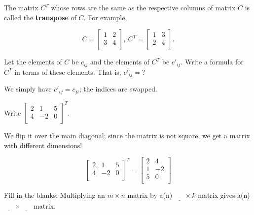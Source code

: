 \documentclass[../gatm_answers.tex]{subfiles}
\begin{document}
\begin{outer_problem}
\item The matrix $C^T$ whose rows are the same as the respective columns of matrix $C$ is called the \textbf{transpose} of $C$. For example,

$$C=\left[\begin{array}{cc}
1 & 2 \\
3 & 4 \\
\end{array}\right],\: C^T=\left[\begin{array}{cc}
1 & 3 \\
2 & 4 \\
\end{array}\right].$$
\end{outer_problem}

\begin{inner_problem}[start=1]
\item Let the elements of $C$ be $c_{ij}$ and the elements of $C^T$ be $c'_{ij}$. Write a formula for $C^T$ in terms of these elements. That is, $c'_{ij} = $?
\end{inner_problem}

We simply have $c'_{ij} = c_{ji}$; the indices are swapped.

\begin{inner_problem}
\item Write $\left[\begin{array}{ccc}
2 & 1 & 5 \\
4 & -2 & 0 \\
\end{array}\right]^T$.
\end{inner_problem}

We flip it over the main diagonal; since the matrix is not square, we get a matrix with different dimensions!

$$\left[\begin{array}{ccc}
2 & 1 & 5 \\
4 & -2 & 0 \\
\end{array}\right]^T = \begin{bmatrix}
2 & 4 \\
1 & -2 \\
5 & 0 \\
\end{bmatrix}$$

\begin{outer_problem}
\item Fill in the blanks: Multiplying an $m\times n$ matrix by a(n) $\underline{\phantom{egg}} \times k$ matrix gives a(n) $\underline{\phantom{egg}}\times\underline{\phantom{egg}}$ matrix.
\end{outer_problem}
\end{document}
